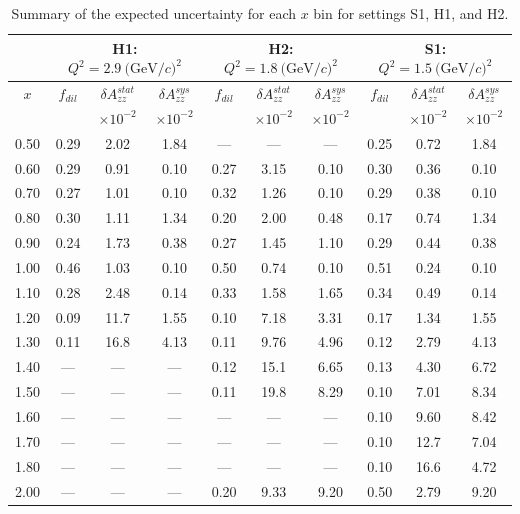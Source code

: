 \begin{table}
\begin{center}
\begin{tabular}{c|ccc|ccc|ccc}
 ~ & \multicolumn{3}{|c}{H1: $Q^2=2.9\mathrm{~(GeV/}c)^2$} & \multicolumn{3}{|c}{H2: $Q^2=1.8\mathrm{~(GeV/}c)^2$} & \multicolumn{3}{|c}{S1: $Q^2=1.5\mathrm{~(GeV/}c)^2$} \\
 \hline
  $x$  & $f_{dil}$ & $\delta A_{zz}^{stat}$ & $\delta A_{zz}^{sys}$ & $f_{dil}$ & $\delta A_{zz}^{stat}$ & $\delta A_{zz}^{sys}$ & $f_{dil}$ & $\delta A_{zz}^{stat}$ & $\delta A_{zz}^{sys}$ \\
  &     & $\times 10^{-2}$  & $\times 10^{-2}$  &    & $\times 10^{-2}$  & $\times 10^{-2}$ &    & $\times 10^{-2}$  & $\times 10^{-2}$ \\
\hline\hline
 0.50   &  0.29	 & 2.02	& 1.84	& ---	& ---	& ---	& 0.25	& 0.72	& 1.84 \\
 0.60   &  0.29	 & 0.91	& 0.10	& 0.27	& 3.15	& 0.10	& 0.30	& 0.36	& 0.10 \\ 
 0.70   &  0.27	 & 1.01	& 0.10	& 0.32	& 1.26	& 0.10	& 0.29	& 0.38	& 0.10 \\
 0.80	&  0.30	 & 1.11	& 1.34	& 0.20	& 2.00	& 0.48	& 0.17	& 0.74	& 1.34 \\
 0.90	&  0.24	 & 1.73 	& 0.38 	& 0.27	& 1.45	& 1.10	& 0.29	& 0.44	& 0.38 \\
 1.00	&  0.46	 & 1.03	& 0.10 	& 0.50	& 0.74	& 0.10	& 0.51	& 0.24	& 0.10 \\
 1.10	&  0.28	 & 2.48	& 0.14 	& 0.33	& 1.58	& 1.65	& 0.34	& 0.49	& 0.14 \\
 1.20	&  0.09	 & 11.7	& 1.55 	& 0.10	& 7.18	& 3.31	& 0.17	& 1.34	& 1.55 \\
 1.30	&  0.11	 & 16.8	& 4.13 	& 0.11	& 9.76	& 4.96	& 0.12	& 2.79	& 4.13 \\
 1.40	&  ---	 & ---	& --- 	& 0.12	& 15.1	& 6.65	& 0.13	& 4.30	& 6.72 \\
 1.50	&  ---	 & ---	& ---	& 0.11	& 19.8	& 8.29	& 0.10	& 7.01	& 8.34 \\
 1.60	&  ---	 & ---	& --- 	& ---	& ---	& ---	& 0.10	& 9.60	& 8.42 \\
 1.70	&  ---	 & ---	& --- 	& ---	& ---	& ---	& 0.10	& 12.7	& 7.04 \\
 1.80	&  ---	 & ---	& --- 	& ---	& ---	& ---	& 0.10	& 16.6	& 4.72 \\
 2.00   &  ---	 & ---	& ---	& 0.20	& 9.33	& 9.20	& 0.50	& 2.79	& 9.20 \\
\hline\hline
\end{tabular}
\caption{\label{RATES2}Summary of the expected uncertainty for each $x$ bin for settings S1, H1, and H2. }
\end{center}
\end{table}


